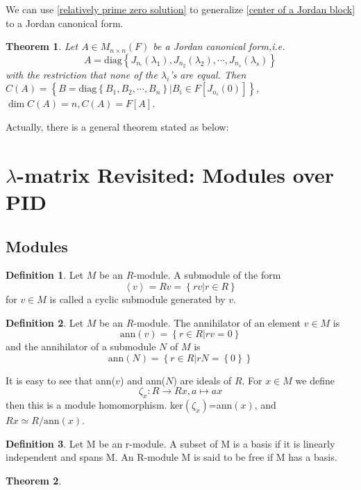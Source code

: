 \documentclass{book}
\newtheorem{theorem}{Theorem}[section]
\theoremstyle{definition}
\newtheorem{definition}{Definition}[section]
\begin{document}
We can use \ref{relatively prime zero solution} to generalize \ref{center of a Jordan block} to a Jordan canonical form.
\begin{theorem}
Let $A\in M_{n\times n}(F)$ be a Jordan canonical form,i.e.\[A=\text{diag}\left \{J_{n_!}(\lambda_1),J_{n_2}(\lambda_2),\cdots,J_{n_s}(\lambda_s)\right\}\]
with the restriction that none of the $\lambda_i$'s are equal. Then $C(A)=\left\{B=\text{diag}\left\{B_1,B_2,\cdots,B_n\right\}|B_i\in F[J_{n_i}(0)]\right\}$, $\dim C(A)=n, C(A)=F[A]$.
\end{theorem}
Actually, there is a general theorem stated as below:

\section{$\lambda$-matrix Revisited: Modules over PID}
\subsection{Modules}
\begin{definition}
Let $M$ be an $R$-module. A submodule of the form\[\left \langle v \right \rangle =Rv=\left \{ rv|r\in R \right \} \]for $v\in M$ is called a cyclic submodule generated by $v$.
\end{definition}
\begin{definition}
Let $M$ be an $R$-module. The annihilator of an element $v\in M$ is \[\text{ann}(v)=\left\{r\in R|rv=0\right\}\]and the annihilator of a submodule $N$ of $M$ is \[\text{ann}(N)=\left\{r\in R|rN=\left\{0\right\}\right\}\]
\end{definition}
It is easy to see that ann($v$) and ann($N$) are ideals of $R$. For $x\in M$ we define \[\zeta_x: R\longrightarrow Rx, a\mapsto ax\]then this is a module homomorphism. ker$(\zeta_x)$=ann$(x)$, and $Rx\simeq R/\text{ann}(x)$.
\begin{definition}
Let M be an r-module. A subset of M is a basis if it is linearly independent and spans M. An R-module M is said to be free if M has a basis.
\end{definition}
\begin{theorem}

\end{theorem}
\end{document}
